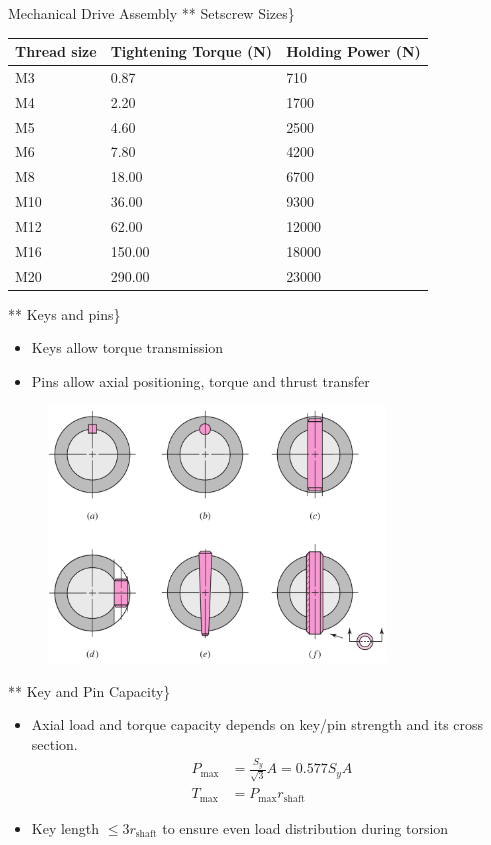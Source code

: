 \documentclass[10pt, svgnames]{beamer}
\begin{document}
\begin{frame}[label={sec:org4427caa}]{Mechanical Drive Assembly}
** Setscrew Sizes\}
\begin{table}[htbp]
  \centering
  \begin{tabular}{lll}
    \toprule
    Thread size & Tightening Torque (N) & Holding Power (N) \\
    \midrule
    M3 & 0.87 & 710 \\
    M4 & 2.20 & 1700 \\
    M5 & 4.60 & 2500 \\
    M6 & 7.80 & 4200 \\
    M8 & 18.00 & 6700 \\
    M10 & 36.00 & 9300 \\
    M12 & 62.00 & 12000 \\
    M16 & 150.00 & 18000 \\
    M20 & 290.00 & 23000 \\
    \bottomrule
  \end{tabular}
\end{table}


** Keys and pins\}

\begin{itemize}
\item Keys allow torque transmission
\item Pins allow axial positioning, torque and thrust transfer
\end{itemize}

\begin{figure}[htbp]
  \centering
  \includegraphics[width=0.8\textwidth]{Pictures/keys-pins}
\end{figure}


** Key and Pin Capacity\}

\begin{itemize}
\item Axial load and torque capacity depends on key/pin strength and its cross section.
\begin{align*}
  P_{\max} &= \frac{S_{y}}{\sqrt{3}}A = 0.577S_{y}A \\
  T_{\max} &= P_{\max}r_{\text{shaft}}
\end{align*}

\item Key length \(\leqslant 3r_{\text{shaft}}\) to ensure even load distribution during torsion
\end{itemize}
\end{frame}
\end{document}
